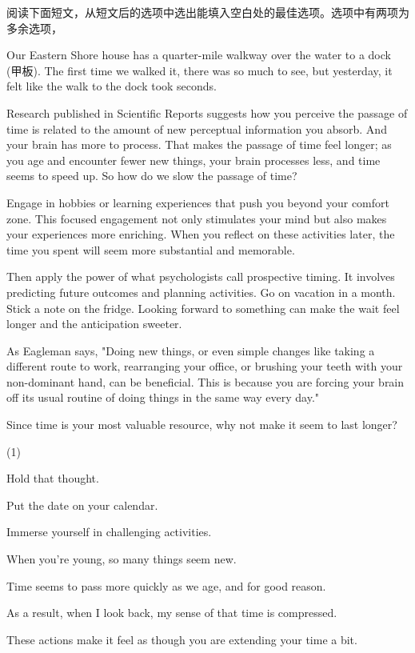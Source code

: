 \documentclass{英语试卷}
\begin{document}
\par 阅读下面短文，从短文后的选项中选出能填入空白处的最佳选项。选项中有两项为多余选项，\par
\par Our Eastern Shore house has a quarter-mile walkway over the water to a dock (甲板). The first time we walked it, there was so much to see, but yesterday, it felt like the walk to the dock took seconds. \par
\par Research published in Scientific Reports suggests how you perceive the passage of time is related to the amount of new perceptual information you absorb.  And your brain has more to process. That makes the passage of time feel longer; as you age and encounter fewer new things, your brain processes less, and time seems to speed up. So how do we slow the passage of time?\par
\par {} Engage in hobbies or learning experiences that push you beyond your comfort zone. This focused engagement not only stimulates your mind but also makes your experiences more enriching. When you reflect on these activities later, the time you spent will seem more substantial and memorable.\par
\par Then apply the power of what psychologists call prospective timing. It involves predicting future outcomes and planning activities. Go on vacation in a month.  Stick a note on the fridge. Looking forward to something can make the wait feel longer and the anticipation sweeter.\par
\par As Eagleman says, "Doing new things, or even simple changes like taking a different route to work, rearranging your office, or brushing your teeth with your non-dominant hand, can be beneficial.  This is because you are forcing your brain off its usual routine of doing things in the same way every day."\par
\par Since time is your most valuable resource, why not make it seem to last longer?\par
\begin{choices}(1)
  \item Hold that thought.
  \item Put the date on your calendar.
  \item Immerse yourself in challenging activities.
  \item When you're young, so many things seem new.
  \item Time seems to pass more quickly as we age, and for good reason.
  \item As a result, when I look back, my sense of that time is compressed.
  \item These actions make it feel as though you are extending your time a bit.
\end{choices}
\end{document}
